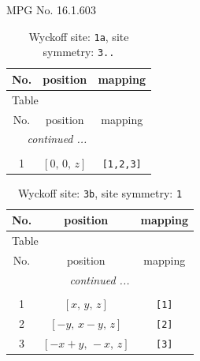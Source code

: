 \documentclass[fleqn,8pt]{jsarticle}
\begin{document}
\setcounter{MaxMatrixCols}{32}

\renewcommand{\tablename}{Table~}
\renewcommand{\figurename}{Figure~}
\begin{center}
\LARGE
MPG No. 16.1.60\quad$3$
\end{center}
\renewcommand{\arraystretch}{1.2}
\begin{longtable}{ccc}
\caption{Wyckoff site: {\tt 1a}, site symmetry: {\tt 3..}}
 \\
 \hline \hline
No. & position & mapping \\ \hline \endfirsthead

\multicolumn{2}{l}{\tablename\ \thetable{}} \\
 \hline \hline
No. & position & mapping \\ \hline \endhead

 \hline \hline
\multicolumn{2}{r}{\footnotesize\it continued ...} \\ \endfoot

 \hline \hline
\multicolumn{2}{r}{} \\ \endlastfoot

1 & $\left[ 0,\, 0,\, z \right]$ & {\tt [1,2,3]} \\
\end{longtable}
\renewcommand{\arraystretch}{1.2}
\begin{longtable}{ccc}
\caption{Wyckoff site: {\tt 3b}, site symmetry: {\tt 1}}
 \\
 \hline \hline
No. & position & mapping \\ \hline \endfirsthead

\multicolumn{2}{l}{\tablename\ \thetable{}} \\
 \hline \hline
No. & position & mapping \\ \hline \endhead

 \hline \hline
\multicolumn{2}{r}{\footnotesize\it continued ...} \\ \endfoot

 \hline \hline
\multicolumn{2}{r}{} \\ \endlastfoot

1 & $\left[ x,\, y,\, z \right]$ & {\tt [1]} \\ \hline
2 & $\left[ - y,\, x - y,\, z \right]$ & {\tt [2]} \\ \hline
3 & $\left[ - x + y,\, - x,\, z \right]$ & {\tt [3]} \\
\end{longtable}
\end{document}

